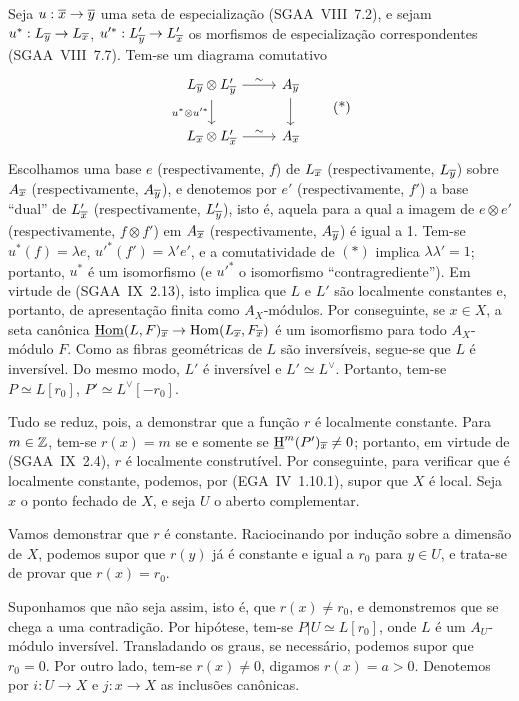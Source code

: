 Seja $u : \overline{x} \to \overline{y}$ uma seta de especialização (SGAA~VIII~7.2), e sejam $u^{*} : L_{\overline{y}} \to L_{\overline{x}}$, $u'^{*} : L'_{\overline{y}} \to L'_{\overline{x}}$ os morfismos de especialização correspondentes (SGAA~VIII~7.7). Tem-se um diagrama comutativo
\begin{equation}
\begin{tikzcd}
L_{\ol{y}} \otimes L'_{\ol{y}} \arrow[r,"\sim"] \arrow[d,"u^{*} \otimes u'^{*}"'] & A_{\ol{y}} \arrow[d] \\
L_{\ol{x}} \otimes L'_{\ol{x}} \arrow[r,"\sim"] & A_{\ol{x}}
\end{tikzcd}
\tag{*}
\end{equation}
Escolhamos uma base $e$ (respectivamente, $f$) de $L_{\overline{x}}$ (respectivamente, $L_{\overline{y}}$) sobre $A_{\overline{x}}$ (respectivamente, $A_{\overline{y}}$), e denotemos por $e'$ (respectivamente, $f'$) a base ``dual'' de $L'_{\overline{x}}$ (respectivamente, $L'_{\overline{y}}$), isto é, aquela para a qual a imagem de $e \otimes e'$ (respectivamente, $f \otimes f'$) em $A_{\overline{x}}$ (respectivamente, $A_{\overline{y}}$) é igual a 1. Tem-se $u^{*}(f) = \lambda e$, $u'^{*}(f') = \lambda' e'$, e a comutatividade de $(*)$ implica $\lambda\lambda' = 1$; portanto, $u^{*}$ é um isomorfismo (e $u'^{*}$ o isomorfismo ``contragrediente''). Em virtude de (SGAA~IX~2.13), isto implica que $L$ e $L'$ são localmente constantes e, portanto, de apresentação finita como $A_X$-módulos. Por conseguinte, se $x \in X$, a seta canônica $\underline{\operatorname{Hom}}(L,F)_{\overline{x}} \to \operatorname{Hom}(L_{\overline{x}}, F_{\overline{x}})$ é um isomorfismo para todo $A_X$-módulo $F$. Como as fibras geométricas de $L$ são inversíveis, segue-se que $L$ é inversível. Do mesmo modo, $L'$ é inversível e $L' \simeq L^{\vee}$. Portanto, tem-se $P \simeq L[r_0]$, $P' \simeq L^{\vee}[-r_0]$.

Tudo se reduz, pois, a demonstrar que a função $r$ é localmente constante. Para $m \in \mathbb{Z}$, tem-se $r(x) = m$ se e somente se $\underline{\mathrm H}^{m}(P')_{\overline{x}} \neq 0$; portanto, em virtude de (SGAA~IX~2.4), $r$ é localmente construtível. Por conseguinte, para verificar que é localmente constante, podemos, por (EGA~IV~1.10.1), supor que $X$ é local. Seja $x$ o ponto fechado de $X$, e seja $U$ o aberto complementar.

Vamos demonstrar que $r$ é constante. Raciocinando por indução sobre a dimensão de $X$, podemos supor que $r(y)$ já é constante e igual a $r_0$ para $y \in U$, e trata-se de provar que $r(x) = r_0$.

Suponhamos que não seja assim, isto é, que $r(x) \neq r_0$, e demonstremos que se chega a uma contradição. Por hipótese, tem-se $P|U \simeq L[r_0]$, onde $L$ é um $A_U$-módulo inversível. Transladando os graus, se necessário, podemos supor que $r_0 = 0$. Por outro lado, tem-se $r(x) \neq 0$, digamos $r(x) = a > 0$. Denotemos por $i : U \to X$ e $j : x \to X$ as inclusões canônicas.

